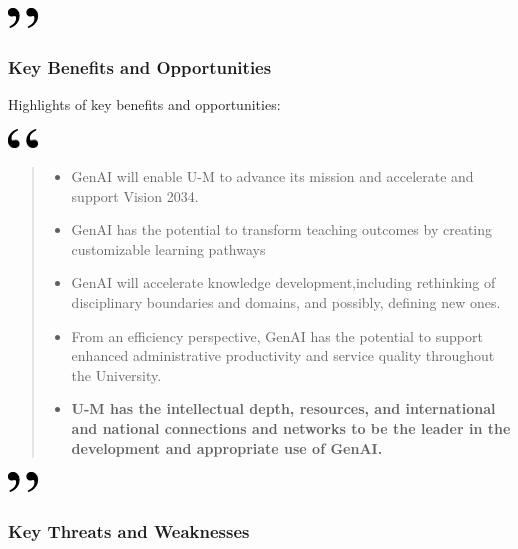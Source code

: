 \documentclass[
]{book}
\begin{document}
\includegraphics[width=0.3125in,height=0.20833in]{close.png}

\hypertarget{key-benefits-and-opportunities}{%
\subsubsection*{Key Benefits and Opportunities}\label{key-benefits-and-opportunities}}

Highlights of key benefits and opportunities:

\includegraphics[width=0.3125in,height=0.20833in]{open.png}

\begin{quote}
\begin{itemize}
\item
  GenAI will enable U-M to advance its mission and accelerate and support Vision 2034.
\item
  GenAI has the potential to transform teaching outcomes by creating customizable learning pathways
\item
  GenAI will accelerate knowledge development,including rethinking of disciplinary boundaries and domains, and possibly, defining new ones.
\item
  From an efficiency perspective, GenAI has the potential to support enhanced administrative productivity and service quality throughout the University.
\item
  \textbf{U-M has the intellectual depth, resources, and international and national connections and networks to be the leader in the development and appropriate use of GenAI.}
\end{itemize}
\end{quote}

\includegraphics[width=0.3125in,height=0.20833in]{close.png}

\hypertarget{key-threats-and-weaknesses}{%
\subsubsection*{Key Threats and Weaknesses}\label{key-threats-and-weaknesses}}
\end{document}
